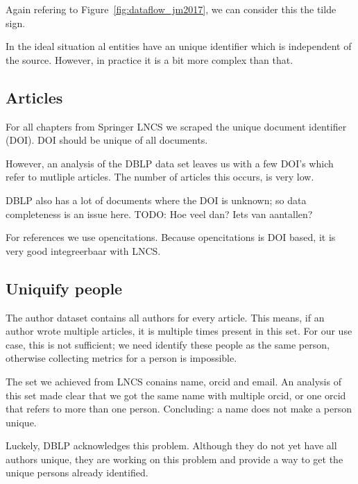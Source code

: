 \documentclass{ou-report}
\newcommand{\todo}[1]{{\color{red} TODO: #1}}
\begin{document}
Again refering to Figure~\ref{fig:dataflow_jm2017}, we can consider this the 
tilde sign.

In the ideal situation al entities have an unique identifier which is 
independent of the source. However, in practice it is a bit more complex than 
that.



\subsection{Articles}
For all chapters from Springer LNCS we scraped the unique document identifier 
(DOI). DOI should be unique of all documents.

However, an analysis of the DBLP data set leaves us with a few DOI's which refer
to mutliple articles. The number of articles this occurs, is very low.

DBLP also has a lot of documents where the DOI is unknown; so data completeness 
is an issue here. \todo{Hoe veel dan? Iets van aantallen?}

For references we use opencitations. Because opencitations is DOI based, it is 
very good integreerbaar with LNCS.



\subsection{Uniquify people}
The author dataset contains all authors for every article. This means, if an 
author wrote multiple articles, it is multiple times present in this set. For
our use case, this is not sufficient; we need identify these people as the same 
person, otherwise collecting metrics for a person is impossible.

The set we achieved from LNCS conains name, orcid and email. An analysis of this
set made clear that we got the same name with multiple orcid, or one orcid that 
refers to more than one person. Concluding: a name does not make a person 
unique.

Luckely, DBLP acknowledges this problem. Although they do not yet have all 
authors unique, they are working on this problem and provide a way to get the 
unique persons already identified.
\end{document}
